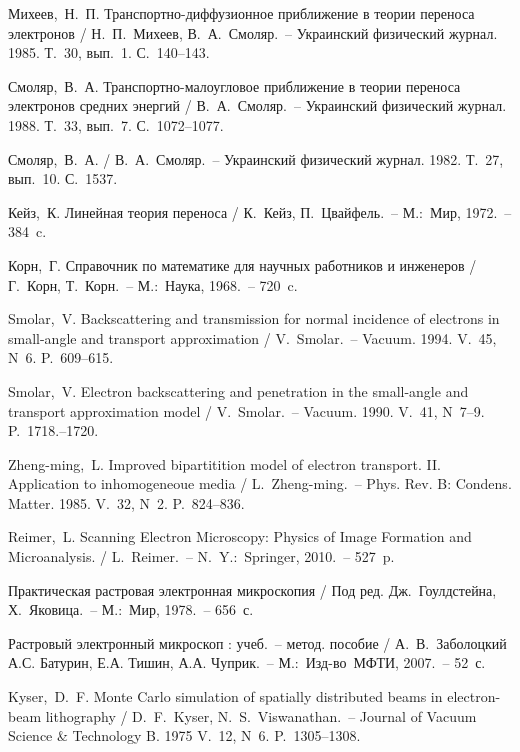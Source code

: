 \begin{thebibliography}{99}  

 Михеев,~Н.~П. Транспортно-диффузионное приближение в теории
переноса электронов / Н.~П.~Михеев, В.~А.~Смоляр.~-- Украинский физический
журнал. 1985. Т.~30, вып.~1. С.~140--143.

 Смоляр,~В.~А. Транспортно-малоугловое приближение в теории
переноса электронов средних энергий / В.~А.~Смоляр.~-- Украинский физический
журнал. 1988. Т.~33, вып.~7. С.~1072--1077.

 Смоляр,~В.~А. / В.~А.~Смоляр.~-- Украинский физический журнал.
1982. Т.~27, вып.~10. С.~1537. %

 Кейз,~К. Линейная теория переноса / К.~Кейз, П.~Цвайфель.~--
М.:~Мир, 1972.~-- 384~c.

 Корн,~Г. Справочник по математике для научных работников и
инженеров /  Г.~Корн, Т.~Корн.~-- М.:~Наука, 1968.~-- 720~c.

 Smolar,~V. Backscattering and transmission for normal
incidence of electrons in small-angle and transport approximation /
V.~Smolar.~-- Vacuum. 1994. V.~45, N~6. P.~609--615.

 Smolar,~V. Electron backscattering and penetration in the
small-angle and transport approximation model / V.~Smolar.~-- Vacuum. 1990.
V.~41, N~7--9. P.~1718.--1720.

 Zheng-ming,~L. Improved bipartitition model of electron
transport. II. Application to inhomogeneoue media / L.~Zheng-ming.~-- Phys. Rev. B:
Condens. Matter. 1985. V.~32, N~2. P.~824--836.


 Reimer,~L. Scanning Electron Microscopy: Physics of Image Formation
and Microanalysis. / L.~Reimer.~-- N.~Y.:~Springer, 2010.~-- 527~p.

 Практическая растровая электронная микроскопия / Под ред.
Дж.~Гоулдстейна, Х.~Яковица.~-- М.:~Мир, 1978.~-- 656~с.

 Растровый электронный микроскоп : учеб.~-- метод. пособие /
А.~В.~Заболоцкий А.С. Батурин, Е.А. Тишин, А.А. Чуприк.~-- М.:~Изд-во~МФТИ, 2007.~--
52~с.

 Kyser,~D.~F. Monte Carlo simulation of spatially
distributed beams in electron-beam lithography / D.~F.~Kyser,
N.~S.~Viswanathan.~-- Journal of Vacuum Science \& Technology B. 1975 V.~12,
N~6. P.~1305--1308.


\end{thebibliography}
